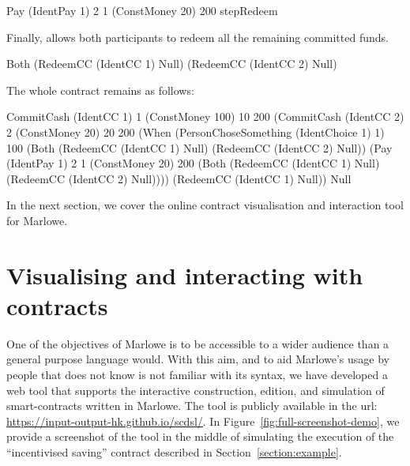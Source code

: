 \documentclass[
      acmsmall
    , screen
    , review=true
  ]{acmart}
\begin{document}
\begin{haskellcode}
Pay (IdentPay 1) 2 1 (ConstMoney 20) 200 stepRedeem
\end{haskellcode}

Finally,  allows both participants to redeem all the remaining committed funds.

\begin{haskellcode}
Both (RedeemCC (IdentCC 1) Null)
     (RedeemCC (IdentCC 2) Null)
\end{haskellcode}

The whole contract remains as follows:
\begin{haskellcode}
CommitCash (IdentCC 1) 1
           (ConstMoney 100)
           10 200
           (CommitCash (IdentCC 2) 2
                       (ConstMoney 20)
                       20 200
                       (When (PersonChoseSomething (IdentChoice 1) 1)
                             100
                             (Both (RedeemCC (IdentCC 1) Null)
                                   (RedeemCC (IdentCC 2) Null))
                             (Pay (IdentPay 1) 2 1
                                  (ConstMoney 20)
                                  200
                                  (Both (RedeemCC (IdentCC 1) Null)
                                        (RedeemCC (IdentCC 2) Null))))
                       (RedeemCC (IdentCC 1) Null))
           Null
\end{haskellcode}
In the next section, we cover the online contract visualisation and interaction tool for Marlowe.


\section{Visualising and interacting with contracts}

\label{section:tool}

One of the objectives of Marlowe is to be accessible to a wider audience
than a general purpose language would. With this aim, and to aid Marlowe's
usage by people that does not know is not familiar with its syntax,
we have developed a web tool that supports the interactive construction,
edition, and simulation of smart-contracts written in Marlowe. The
tool is publicly available in the url: \url{https://input-output-hk.github.io/scdsl/}.
In Figure~\ref{fig:full-screenshot-demo}, we provide a screenshot
of the tool in the middle of simulating the execution of the ``incentivised
saving'' contract described in Section~\ref{section:example}.
\end{document}
